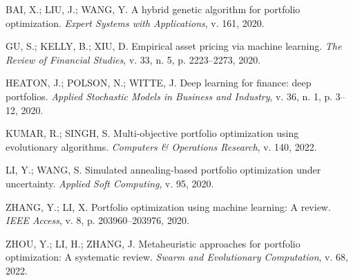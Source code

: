 \documentclass[
  12pt,
  oneside,
  a4paper,
  brazil
]{abntex2}
\begin{document}
BAI, X.; LIU, J.; WANG, Y. A hybrid genetic algorithm for portfolio optimization. \textit{Expert Systems with Applications}, v. 161, 2020.

GU, S.; KELLY, B.; XIU, D. Empirical asset pricing via machine learning. \textit{The Review of Financial Studies}, v. 33, n. 5, p. 2223--2273, 2020.

HEATON, J.; POLSON, N.; WITTE, J. Deep learning for finance: deep portfolios. \textit{Applied Stochastic Models in Business and Industry}, v. 36, n. 1, p. 3--12, 2020.

KUMAR, R.; SINGH, S. Multi-objective portfolio optimization using evolutionary algorithms. \textit{Computers \& Operations Research}, v. 140, 2022.

LI, Y.; WANG, S. Simulated annealing-based portfolio optimization under uncertainty. \textit{Applied Soft Computing}, v. 95, 2020.

ZHANG, Y.; LI, X. Portfolio optimization using machine learning: A review. \textit{IEEE Access}, v. 8, p. 203960--203976, 2020.

ZHOU, Y.; LI, H.; ZHANG, J. Metaheuristic approaches for portfolio optimization: A systematic review. \textit{Swarm and Evolutionary Computation}, v. 68, 2022.
\end{document}
